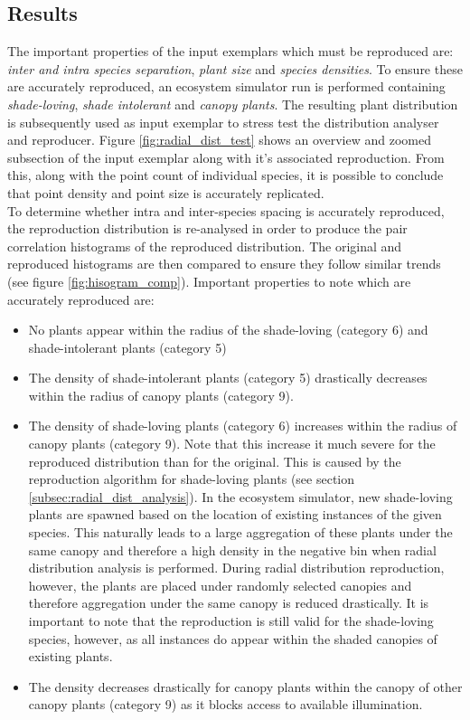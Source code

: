 \subsection{Results} \label{subsec:dist_anal_results}

The important properties of the input exemplars which must be reproduced are: \textit{inter and intra species separation}, \textit{plant size} and \textit{species densities}. To ensure these are accurately reproduced, an ecosystem simulator run is performed containing \textit{shade-loving}, \textit{shade intolerant} and \textit{canopy plants}. The resulting plant distribution is subsequently used as input exemplar to stress test the distribution analyser and reproducer. Figure \ref{fig:radial_dist_test} shows an overview and zoomed subsection of the input exemplar along with it's associated reproduction. From this, along with the point count of individual species, it is possible to conclude that point density and point size is accurately replicated.\\
To determine whether intra and inter-species spacing is accurately reproduced, the reproduction distribution is re-analysed in order to produce the pair correlation histograms of the reproduced distribution. The original and reproduced histograms are then compared to ensure they follow similar trends (see figure \ref{fig:hisogram_comp}). Important properties to note which are accurately reproduced are:
\begin{itemize}
\item No plants appear within the radius of the shade-loving (category 6) and shade-intolerant plants (category 5)
\item The density of shade-intolerant plants (category 5) drastically decreases within the radius of canopy plants (category 9).
\item The density of shade-loving plants (category 6) increases within the radius of canopy plants (category 9). Note that this increase it much severe for the reproduced distribution than for the original. This is caused by the reproduction algorithm for shade-loving plants (see section \ref{subsec:radial_dist_analysis}). In the ecosystem simulator, new shade-loving plants are spawned based on the location of existing instances of the given species. This naturally leads to a large aggregation of these plants under the same canopy and therefore a high density in the negative bin when radial distribution analysis is performed. During radial distribution reproduction, however, the plants are placed under randomly selected canopies and therefore aggregation under the same canopy is reduced drastically. It is important to note that the reproduction is still valid for the shade-loving species, however, as all instances do appear within the shaded canopies of existing plants.
\item The density decreases drastically for canopy plants within the canopy of other canopy plants (category 9) as it blocks access to available illumination.
\end{itemize}

